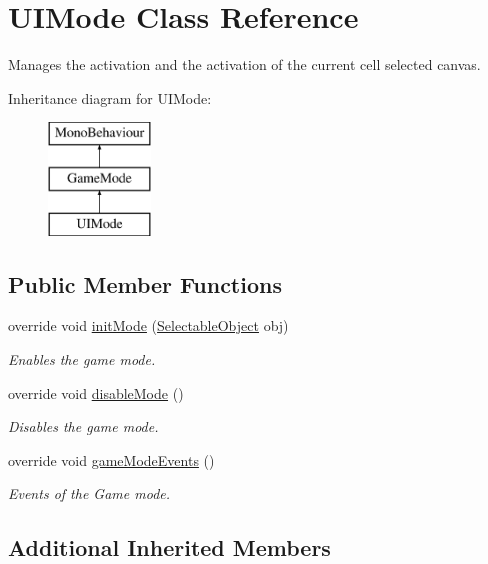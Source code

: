 \hypertarget{class_u_i_mode}{}\section{U\+I\+Mode Class Reference}
\label{class_u_i_mode}


Manages the activation and the activation of the current cell selected canvas.  


Inheritance diagram for U\+I\+Mode\+:\begin{figure}[H]
\begin{center}
\leavevmode
\includegraphics[height=3.000000cm]{class_u_i_mode}
\end{center}
\end{figure}
\subsection*{Public Member Functions}
\begin{DoxyCompactItemize}
\item 
override void \mbox{\hyperlink{class_u_i_mode_a97dcd9e20017c87075bcc9c1a560d8a8}{init\+Mode}} (\mbox{\hyperlink{class_selectable_object}{Selectable\+Object}} obj)
\begin{DoxyCompactList}\small\item\em Enables the game mode. \end{DoxyCompactList}\item 
override void \mbox{\hyperlink{class_u_i_mode_a0dd6193dde5d68b9e1bc94f8a7468db5}{disable\+Mode}} ()
\begin{DoxyCompactList}\small\item\em Disables the game mode. \end{DoxyCompactList}\item 
override void \mbox{\hyperlink{class_u_i_mode_a9a0cb075f349e557e8aa8f9f55748c05}{game\+Mode\+Events}} ()
\begin{DoxyCompactList}\small\item\em Events of the Game mode. \end{DoxyCompactList}\end{DoxyCompactItemize}
\subsection*{Additional Inherited Members}


